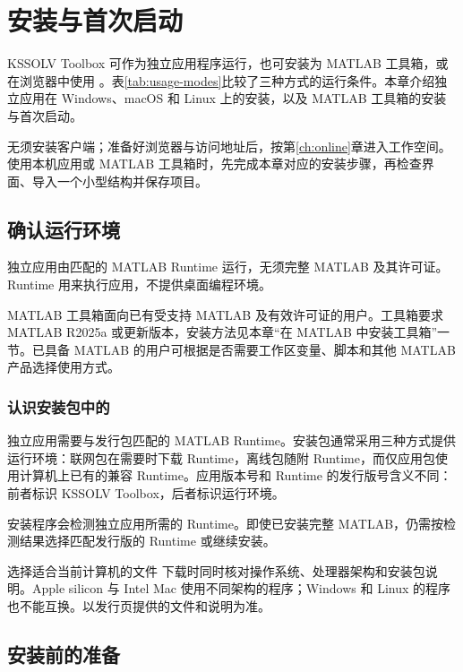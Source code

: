 \chapter{安装与首次启动}\label{ch:install}

KSSOLV Toolbox 可作为独立应用程序运行，也可安装为 MATLAB\regmark{} 工具箱，或在浏览器中使用 \ksonline{}。表\ref{tab:usage-modes}比较了三种方式的运行条件。本章介绍独立应用在 Windows、macOS 和 Linux 上的安装，以及 MATLAB\regmark{} 工具箱的安装与首次启动。

\ksonline{} 无须安装客户端；准备好浏览器与访问地址后，按第\ref{ch:online}章进入工作空间。使用本机应用或 MATLAB\regmark{} 工具箱时，先完成本章对应的安装步骤，再检查界面、导入一个小型结构并保存项目。

\section{确认运行环境}

独立应用由匹配的 MATLAB\regmark{} Runtime 运行，无须完整 MATLAB\regmark{} 及其许可证。Runtime 用来执行应用，不提供桌面编程环境。

MATLAB\regmark{} 工具箱面向已有受支持 MATLAB\regmark{} 及有效许可证的用户。工具箱要求 MATLAB\regmark{} R2025a 或更新版本，安装方法见本章“在 MATLAB\regmark{} 中安装工具箱”一节。已具备 MATLAB\regmark{} 的用户可根据是否需要工作区变量、脚本和其他 MATLAB\regmark{} 产品选择使用方式。

\subsection{认识安装包中的 }

独立应用需要与发行包匹配的 MATLAB\regmark{} Runtime。安装包通常采用三种方式提供运行环境：联网包在需要时下载 Runtime，离线包随附 Runtime，而仅应用包使用计算机上已有的兼容 Runtime。应用版本号和 Runtime 的发行版号含义不同：前者标识 KSSOLV Toolbox，后者标识运行环境。

安装程序会检测独立应用所需的 Runtime。即使已安装完整 MATLAB\regmark{}，仍需按检测结果选择匹配发行版的 Runtime 或继续安装。

\begin{notebox}{选择适合当前计算机的文件}
下载时同时核对操作系统、处理器架构和安装包说明。Apple silicon 与 Intel Mac 使用不同架构的程序；Windows 和 Linux 的程序也不能互换。以发行页提供的文件和说明为准。
\end{notebox}

\section{安装前的准备}

